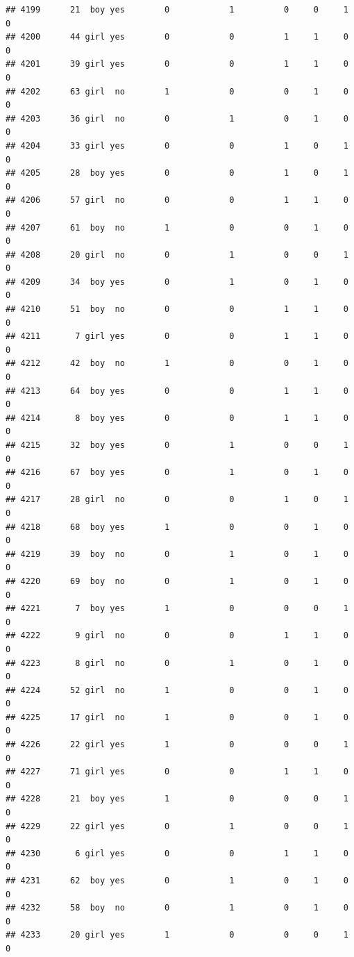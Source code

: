 \documentclass[man]{apa6}
\begin{document}
\begin{verbatim}
## 4199      21  boy yes        0            1          0     0     1     0
## 4200      44 girl yes        0            0          1     1     0     0
## 4201      39 girl yes        0            0          1     1     0     0
## 4202      63 girl  no        1            0          0     1     0     0
## 4203      36 girl  no        0            1          0     1     0     0
## 4204      33 girl yes        0            0          1     0     1     0
## 4205      28  boy yes        0            0          1     0     1     0
## 4206      57 girl  no        0            0          1     1     0     0
## 4207      61  boy  no        1            0          0     1     0     0
## 4208      20 girl  no        0            1          0     0     1     0
## 4209      34  boy yes        0            1          0     1     0     0
## 4210      51  boy  no        0            0          1     1     0     0
## 4211       7 girl yes        0            0          1     1     0     0
## 4212      42  boy  no        1            0          0     1     0     0
## 4213      64  boy yes        0            0          1     1     0     0
## 4214       8  boy yes        0            0          1     1     0     0
## 4215      32  boy yes        0            1          0     0     1     0
## 4216      67  boy yes        0            1          0     1     0     0
## 4217      28 girl  no        0            0          1     0     1     0
## 4218      68  boy yes        1            0          0     1     0     0
## 4219      39  boy  no        0            1          0     1     0     0
## 4220      69  boy  no        0            1          0     1     0     0
## 4221       7  boy yes        1            0          0     0     1     0
## 4222       9 girl  no        0            0          1     1     0     0
## 4223       8 girl  no        0            1          0     1     0     0
## 4224      52 girl  no        1            0          0     1     0     0
## 4225      17 girl  no        1            0          0     1     0     0
## 4226      22 girl yes        1            0          0     0     1     0
## 4227      71 girl yes        0            0          1     1     0     0
## 4228      21  boy yes        1            0          0     0     1     0
## 4229      22 girl yes        0            1          0     0     1     0
## 4230       6 girl yes        0            0          1     1     0     0
## 4231      62  boy yes        0            1          0     1     0     0
## 4232      58  boy  no        0            1          0     1     0     0
## 4233      20 girl yes        1            0          0     0     1     0

\end{verbatim}
\end{document}
